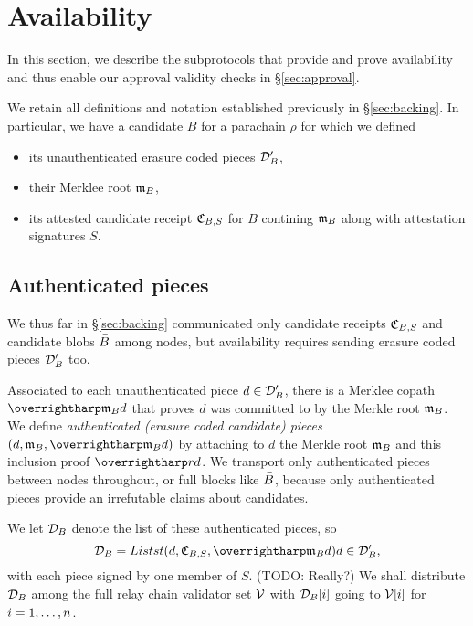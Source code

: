 
\section{Availability}
\label{sec:availability}


In this section, we describe the subprotocols that provide and prove availability and thus enable our approval validity checks in \S\ref{sec:approval}.  

We retain all definitions and notation established previously in \S\ref{sec:backing}.  In particular, we have a candidate $B$ for a parachain $\rho$ for which we defined
\begin{itemize}
\item its unauthenticated erasure coded pieces $\mathcal{D}'_B$,
\item their Merklee root $\mathfrak{m}_B$, 
\item its attested candidate receipt $\mathfrak{C}_{B,S}$ for $B$ contining $\mathfrak{m}_B$ along with attestation signatures $S$.
\end{itemize}


\subsection{Authenticated pieces}
\label{sec:authenticated_pieces}

We thus far in \S\ref{sec:backing} communicated only candidate receipts $\mathfrak{C}_{B,S}$ and candidate blobs $\bar{B}$ among nodes, but availability requires sending erasure coded pieces $\mathcal{D}'_B$ too.

Associated to each unauthenticated piece $d \in \mathcal{D}'_B$, there is a Merklee copath $\vect{\merkleroot_B d}$ that proves $d$ was committed to by the Merkle root $\mathfrak{m}_B$.  
We define {\em authenticated (erasure coded candidate) pieces} $(d,\merkleroot_B,\vect{\merkleroot_B d})$ by attaching to $d$ the Merkle root $\mathfrak{m}_B$ and this inclusion proof $\vect{rd}$.  
We transport only authenticated pieces between nodes throughout, or full blocks like $\bar{B}$, because only authenticated pieces provide an irrefutable claims about candidates. 

We let $\mathcal{D}_B$ denote the list of these authenticated pieces, so
$$ \pieces_B = Listst{ (d,\receipt_{B,S},\vect{\merkleroot_B d}) }{ d \in \prepieces_B } \mathcomma $$
with each piece signed by one member of $S$.  (TODO: Really?)
%
We shall distribute $\mathcal{D}_B$ among the full relay chain validator set $\mathcal{V}$ with $\mathcal{D}_B[i]$ going to $\mathcal{V}[i]$ for $i = 1,\ldots,n$.  

